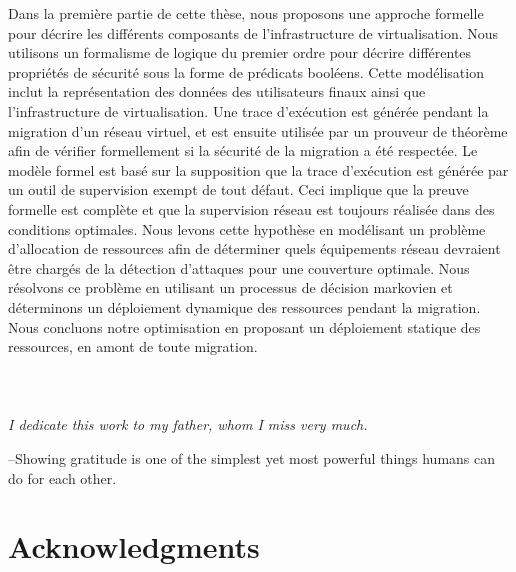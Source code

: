 \documentclass[a4paper, 11pt]{report}
\theoremstyle{definition}
\begin{document}
Dans la premi\`{e}re partie de cette th\`{e}se, nous proposons une approche formelle pour d\'{e}crire les diff\'{e}rents composants de l'infrastructure de virtualisation.
Nous utilisons un formalisme de logique du premier ordre pour d\'{e}crire diff\'{e}rentes propri\'{e}t\'{e}s de s\'{e}curit\'{e} sous la forme de pr\'{e}dicats bool\'{e}ens. 
Cette mod\'{e}lisation inclut la repr\'{e}sentation des donn\'{e}es des utilisateurs finaux ainsi que l'infrastructure de virtualisation.
Une trace d'ex\'{e}cution est g\'{e}n\'{e}r\'{e}e pendant la migration d'un r\'{e}seau virtuel, et est ensuite utilis\'{e}e par un prouveur de th\'{e}or\`{e}me afin de v\'{e}rifier formellement si la s\'{e}curit\'{e} de la migration a \'{e}t\'{e} respect\'{e}e. Le mod\`{e}le formel est bas\'{e} sur la supposition que la trace d'ex\'{e}cution est g\'{e}n\'{e}r\'{e}e par un outil de supervision exempt de tout d\'{e}faut. Ceci implique que la preuve formelle est compl\`{e}te et que la supervision r\'{e}seau est toujours r\'{e}alis\'{e}e dans des conditions optimales. Nous levons cette hypoth\`{e}se en mod\'{e}lisant un probl\`{e}me d'allocation de ressources afin de d\'{e}terminer quels \'{e}quipements r\'{e}seau devraient \^{e}tre charg\'{e}s de la d\'{e}tection d'attaques pour une couverture optimale. Nous r\'{e}solvons ce probl\`{e}me en utilisant un processus de d\'{e}cision markovien et d\'{e}terminons un d\'{e}ploiement dynamique des ressources pendant la migration. Nous concluons notre optimisation en proposant un d\'{e}ploiement statique des ressources, en amont de toute migration.






\chapter*{}
\setcounter{page}{4}
\thispagestyle{empty}

\begin{center}
\textbf{\\[2in]}
\textit{I dedicate this work to my father, whom I miss very much.}    
\end{center}

\begin{savequote}
--Showing gratitude is one of the simplest yet most powerful things humans can do for each other.
\end{savequote}
\chapter*{Acknowledgments}
\end{document}
